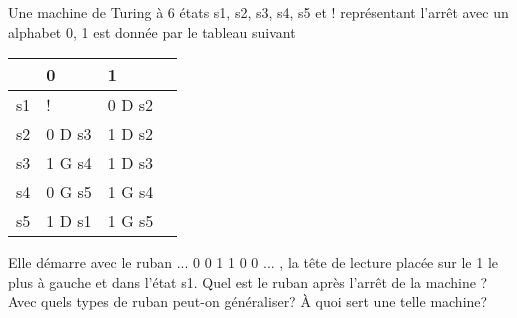 Une machine de Turing à 6 états s1, s2, s3, s4, s5 et ! représentant l'arrêt avec un alphabet 0, 1 est donnée par le tableau suivant
\begin{center}
\renewcommand{\arraystretch}{1.5}
\begin{tabular}{|l|l|l|l|} \hline
   & 0  & 1     \\ \hline
s1 & !      & 0 D s2  \\ \hline
s2 & 0 D s3 & 1 D s2  \\ \hline
s3 & 1 G s4 & 1 D s3  \\ \hline
s4 & 0 G s5 & 1 G s4  \\ \hline
s5 & 1 D s1 & 1 G s5  \\ \hline
\end{tabular}
\end{center}
Elle démarre avec le ruban ... 0 0 1 1 0 0 ... , la tête de lecture placée sur le 1 le plus à gauche et dans l'état s1. Quel est le ruban après l'arrêt de la machine ? Avec quels types de ruban peut-on généraliser? \`A quoi sert une telle machine?
